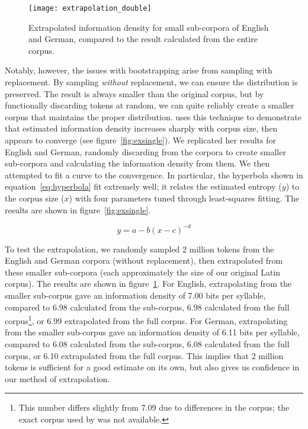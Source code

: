 \documentclass[12pt,twoside]{article}
\begin{document}
\begin{figure}[p]
\centering
\caption{Extrapolated information density for small sub-corpora of English and German, compared to the result calculated from the entire corpus.}
\label{fig:exdouble}
\noindent\texttt{[image: extrapolation\_double]}
\end{figure}

Notably, however, the issues with bootstrapping arise from sampling with replacement. By sampling \emph{without} replacement, we can ensure the distribution is preserved. The result is always smaller than the original corpus, but by functionally discarding tokens at random, we can quite reliably create a smaller corpus that maintains the proper distribution. \citet[57]{oh} uses this technique to demonstrate that estimated information density increases sharply with corpus size, then appears to converge (see figure~\ref{fig:exsingle}). We replicated her results for English and German, randomly discarding from the corpora to create smaller sub-corpora and calculating the information density from them. We then attempted to fit a curve to the convergence. In particular, the hyperbola shown in equation~\ref{eq:hyperbola} fit extremely well; it relates the estimated entropy (\(y\)) to the corpus size (\(x\)) with four parameters tuned through least-squares fitting. The results are shown in figure~\ref{fig:exsingle}.

\begin{equation}
\label{eq:hyperbola}
y = a-b(x-c)^{-d}
\end{equation}

To test the extrapolation, we randomly sampled 2 million tokens from the English and German corpora (without replacement), then extrapolated from these smaller sub-corpora (each approximately the size of our original Latin corpus). The results are shown in figure~\ref{fig:exdouble}. For English, extrapolating from the smaller sub-corpus gave an information density of 7.00 bits per syllable, compared to 6.98 calculated from the sub-corpus, 6.98 calculated from the full corpus\footnote{This number differs slightly from  7.09 due to differences in the corpus; the exact corpus used by \citeauthor{oh} was not available.}, or 6.99 extrapolated from the full corpus. For German, extrapolating from the smaller sub-corpus gave an information density of 6.11 bits per syllable, compared to 6.08 calculated from the sub-corpus, 6.08 calculated from the full corpus, or 6.10 extrapolated from the full corpus. This implies that 2 million tokens is sufficient for a good estimate on its own, but also gives us confidence in our method of extrapolation.
\end{document}

